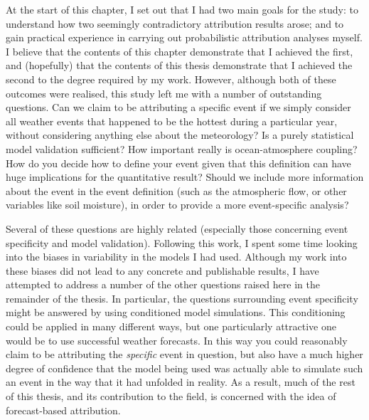   At the start of this chapter, I set out that I had two main goals for the study: to understand how two seemingly contradictory attribution results arose; and to gain practical experience in carrying out probabilistic attribution analyses myself. I believe that the contents of this chapter demonstrate that I achieved the first, and (hopefully) that the contents of this thesis demonstrate that I achieved the second to the degree required by my work. However, although both of these outcomes were realised, this study left me with a number of outstanding questions. Can we claim to be attributing a specific event if we simply consider all weather events that happened to be the hottest during a particular year, without considering anything else about the meteorology? Is a purely statistical model validation sufficient? How important really is ocean-atmosphere coupling? How do you decide how to define your event given that this definition can have huge implications for the quantitative result? Should we include more information about the event in the event definition (such as the atmospheric flow, or other variables like soil moisture), in order to provide a more event-specific analysis? 

  Several of these questions are highly related (especially those concerning event specificity and model validation). Following this work, I spent some time looking into the biases in variability in the models I had used. Although my work into these biases did not lead to any concrete and publishable results, I have attempted to address a number of the other questions raised here in the remainder of the thesis. In particular, the questions surrounding event specificity might be answered by using conditioned model simulations. This conditioning could be applied in many different ways, but one particularly attractive one would be to use successful weather forecasts. In this way you could reasonably claim to be attributing the \emph{specific} event in question, but also have a much higher degree of confidence that the model being used was actually able to simulate such an event in the way that it had unfolded in reality. As a result, much of the rest of this thesis, and its contribution to the field, is concerned with the idea of forecast-based attribution.